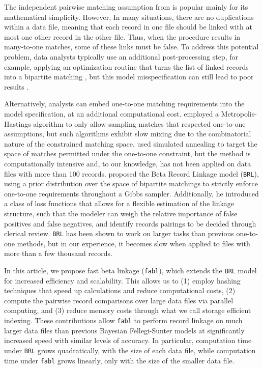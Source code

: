 \documentclass[ba]{imsart}
\begin{document}
The independent pairwise matching assumption from \cite{fellegi_theory_1969} is popular mainly for its mathematical simplicity. However, In many situations, there are no duplications within a data file, meaning that each record in one file should be linked with at most one other record in the other file. Thus, when the procedure results in many-to-one matches, some of these links must be false. To address this potential problem, data analysts typically use an additional post-processing step, for example, applying an optimization routine that turns the list of linked records into a bipartite matching \citep{jaro1989}, but this model misspecification can still lead to poor results \citep{sadinle_bayesian_2017}.

Alternatively, analysts can embed one-to-one matching requirements into the model specification, at an additional computational cost. \cite{Larsen05} employed a Metropolis-Hastings algorithm to only allow sampling matches that respected one-to-one assumptions, but such algorithms exhibit slow mixing due to the combinatorial nature of the constrained matching space. \cite{fortunato_2010} used simulated annealing to target the space of matches permitted under the one-to-one constraint, but the method is computationally intensive and, to our knowledge, has not been applied on data files with more than 100 records. \cite{sadinle_bayesian_2017} proposed the Beta Record Linkage model (\texttt{BRL}), using a prior distribution over the space of bipartite matchings to strictly enforce one-to-one requirements throughout a Gibbs sampler. Additionally, he introduced a class of loss functions that allows for a flexible estimation of the linkage structure, such that the modeler can weigh the relative importance of false positives and false negatives, and identify records pairings to be decided through clerical review. \texttt{BRL} has been shown to work on larger tasks than previous one-to-one methods, but in our experience, it becomes slow when applied to files with more than a few thousand records. 

In this article, we propose fast beta linkage (\texttt{fabl}), which extends the \texttt{BRL} model for increased efficiency and scalability. {} This allows us to (1) employ hashing techniques that speed up calculations and reduce computational costs, (2) compute the pairwise record comparisons over large data files via parallel computing, and (3) reduce memory costs through what we call storage efficient indexing. These contributions allow \texttt{fabl} to perform record linkage on much larger data files than previous Bayesian Fellegi-Sunter models at significantly increased speed with similar levels of accuracy. In particular, computation time under \texttt{BRL} grows quadratically, with the size of each data file, while computation time under \texttt{fabl} grows linearly, only with the size of the smaller data file.
\end{document}
